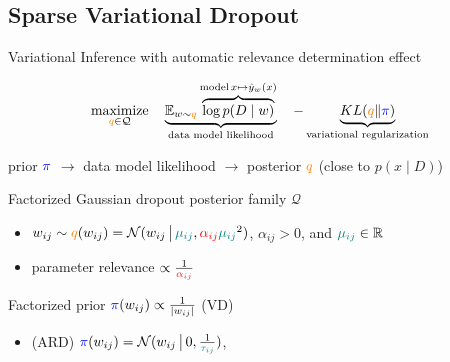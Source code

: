 \documentclass{beamer}
\newcommand{\real}{\mathbb{R}}
\begin{document}
\subsection{Sparse Variational Dropout \citep{molchanov_variational_2017}} %
\label{sub:sparse_variational_dropout}

\begin{frame}[c]{\insertsubsection}{\insertsection}
  Variational Inference with automatic relevance determination effect



  $$
    \underset{
      {\color{orange} q} \in \mathcal{Q}
    }{\text{maximize}}
    \quad
    \underbrace{
      \mathbb{E}_{w \sim {\color{orange} q}}
        \overbrace{
          \log p(D\mid w)  %
        }^{
          \text{model}
          \,
          x\mapsto \hat{y}_w(x)
        }
    }_{
      \text{data model likelihood}
    }
    \quad
    - \underbrace{
      KL({\color{orange} q}\|{\color{blue} \pi})
    }_{
      \text{variational regularization}
    }
    $$

  \medskip
  prior ${\color{blue} \pi}$
    $\to$ data model likelihood
    $\to$ posterior ${\color{orange} q}$
    (close to $p(x \mid D)$)
  
  \bigskip
  Factorized Gaussian dropout posterior family $\mathcal{Q}$
  \begin{itemize}
    \item $
      w_{ij} \sim {\color{orange} q}(w_{ij})
        = \mathcal{N}(
          w_{ij}\,\big\vert\,
          {\color{teal} \mu_{ij}},
          {\color{red} \alpha_{ij}}
            {\color{teal} \mu_{ij}}^2
        )
    $, $\alpha_{ij} > 0$, and ${\color{teal} \mu_{ij}} \in \real$
    \item parameter relevance $\propto \frac1{{\color{red} \alpha_{ij}}}$
  \end{itemize}

  \smallskip
  Factorized prior $
    {\color{blue} \pi}(w_{ij})
      \propto \frac1{\lvert w_{ij}\rvert}
  $ (VD)
  \begin{itemize}
    \item (ARD) $
      {\color{blue} \pi}(w_{ij}) = \mathcal{N}(
        w_{ij}\,\big\vert\,
        0, \tfrac1{{\color{teal} \tau_{ij}}}
      )
    $, \citep{kharitonov_variational_2018}
  \end{itemize}
\end{frame}
\end{document}
